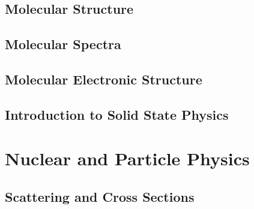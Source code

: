 \documentclass[a4paper, 11pt]{book}
\begin{document}
	\chapter{Molecular Structure}
		
	\chapter{Molecular Spectra}
		
	\chapter{Molecular Electronic Structure}
		
	\chapter{Introduction to Solid State Physics}
		
%		
%		
%		
%		
%		
\part{Nuclear and Particle Physics}
	\chapter{Scattering and Cross Sections}
	
\end{document}
